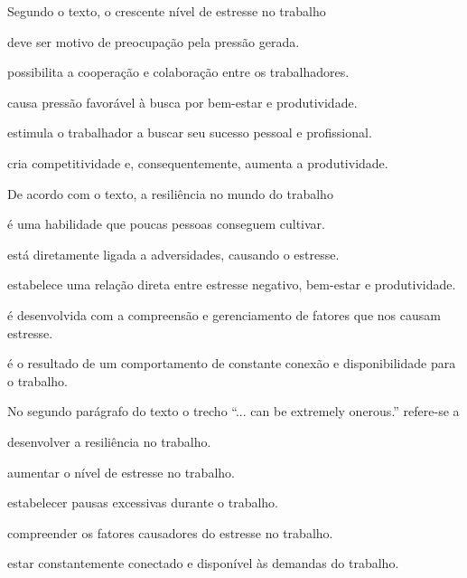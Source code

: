 \questao\label{ing1}
Segundo o texto, o crescente nível de estresse no trabalho
\begin{alternativas}
  \item deve ser motivo de preocupação pela pressão gerada.
  \item possibilita a cooperação e colaboração entre os trabalhadores.
  \item causa pressão favorável à busca por bem-estar e produtividade.
  \item estimula o trabalhador a buscar seu sucesso pessoal e profissional.
  \item cria competitividade e, consequentemente, aumenta a produtividade.
\end{alternativas}

\questao\label{ing2}
﻿De acordo com o texto, a resiliência no mundo do trabalho
\begin{alternativas}
  \item é uma habilidade que poucas pessoas conseguem cultivar.
  \item está diretamente ligada a adversidades, causando o estresse.
  \item estabelece uma relação direta entre estresse negativo, bem-estar e produtividade.
  \item é desenvolvida com a compreensão e gerenciamento de fatores que nos causam estresse.
  \item é o resultado de um comportamento de constante conexão e disponibilidade para o trabalho.
\end{alternativas}

\questao\label{ing3}
No segundo parágrafo do texto o trecho ``... can be extremely onerous.'' refere-se a
\begin{alternativas}
  \item desenvolver a resiliência no trabalho.
  \item aumentar o nível de estresse no trabalho.
  \item estabelecer pausas excessivas durante o trabalho.
  \item compreender os fatores causadores do estresse no trabalho.
  \item estar constantemente conectado e disponível às demandas do trabalho.
\end{alternativas}


